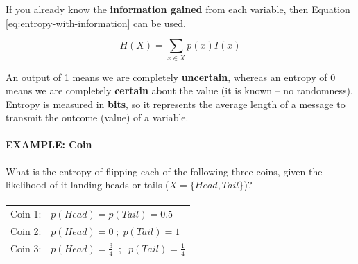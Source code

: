 \documentclass{article}
\begin{document}
If you already know the \textbf{information gained} from each variable, then Equation \ref{eq:entropy-with-information} can be used.

\begin{equation}
	H(X) = \sum_{x \in X} { p(x)I(x) }
	\label{eq:entropy-with-information}
\end{equation}

An output of 1 means we are completely \textbf{uncertain}, whereas an entropy of 0 means we are completely \textbf{certain} about the value (it is known -- no randomness). Entropy is measured in \textbf{bits}, so it represents the average length of a message to transmit the outcome (value) of a variable.

\paragraph{\textbf{EXAMPLE: Coin}} What is the entropy of flipping each of the following three coins, given the likelihood of it landing heads or tails ($X = \lbrace Head, Tail \rbrace$)?
\paragraph{}
\begin{tabular}{ll}
	Coin 1: & $p(Head) = p(Tail) = 0.5$ \\
	Coin 2: & $p(Head) = 0 \; ; \; p(Tail) = 1$ \\
	Coin 3: & $p(Head) = \frac{3}{4} \;\; ; \;\; p(Tail) = \frac{1}{4}$ \\
\end{tabular}
\paragraph{}
\end{document}
